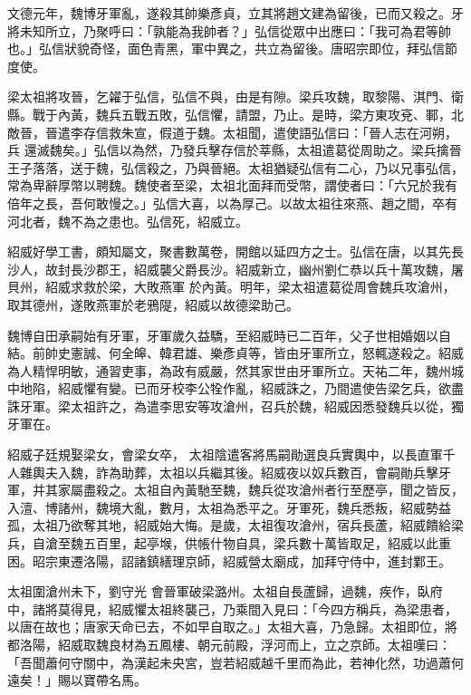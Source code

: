 \begin{pinyinscope}
 文德元年，魏博牙軍亂，遂殺其帥樂彥貞，立其將趙文建為留後，已而又殺之。牙將未知所立，乃聚呼曰：「孰能為我帥者？」弘信從眾中出應曰：「我可為君等帥也。」弘信狀貌奇怪，面色青黑，軍中異之，共立為留後。唐昭宗即位，拜弘信節度使。



 梁太祖將攻晉，乞糴于弘信，弘信不與，由是有隙。梁兵攻魏，取黎陽、淇門、衛縣。戰于內黃，魏兵五戰五敗，弘信懼，請盟，乃止。是時，梁方東攻兗、鄆，北敵晉，晉遣李存信救朱宣，假道于魏。太祖聞，遣使語弘信曰：「晉人志在河朔，兵
 還滅魏矣。」弘信以為然，乃發兵擊存信於莘縣，太祖遣葛從周助之。梁兵擒晉王子落落，送于魏，弘信殺之，乃與晉絕。太祖猶疑弘信有二心，乃以兄事弘信，常為卑辭厚幣以聘魏。魏使者至梁，太祖北面拜而受幣，謂使者曰：「六兄於我有倍年之長，吾何敢慢之。」弘信大喜，以為厚己。以故太祖往來燕、趙之間，卒有河北者，魏不為之患也。弘信死，紹威立。



 紹威好學工書，頗知屬文，聚書數萬卷，開館以延四方之士。弘信在唐，以其先長沙人，故封長沙郡王，紹威襲父爵長沙。紹威新立，幽州劉仁恭以兵十萬攻魏，屠貝州，紹威求救於梁，大敗燕軍
 於內黃。明年，梁太祖遣葛從周會魏兵攻滄州，取其德州，遂敗燕軍於老鴉隄，紹威以故德梁助己。



 魏博自田承嗣始有牙軍，牙軍歲久益驕，至紹威時已二百年，父子世相婚姻以自結。前帥史憲誠、何全皞、韓君雄、樂彥貞等，皆由牙軍所立，怒輒遂殺之。紹威為人精悍明敏，通習吏事，為政有威嚴，然其家世由牙軍所立。天祐二年，魏州城中地陷，紹威懼有變。已而牙校李公牷作亂，紹威誅之，乃間遣使告梁乞兵，欲盡誅牙軍。梁太祖許之，為遣李思安等攻滄州，召兵於魏，紹威因悉發魏兵以從，獨牙軍在。



 紹威子廷規娶梁女，會梁女卒，
 太祖陰遣客將馬嗣勛選良兵實輿中，以長直軍千人雜輿夫入魏，詐為助葬，太祖以兵繼其後。紹威夜以奴兵數百，會嗣勛兵擊牙軍，并其家屬盡殺之。太祖自內黃馳至魏，魏兵從攻滄州者行至歷亭，聞之皆反，入澶、博諸州，魏境大亂，數月，太祖為悉平之。牙軍死，魏兵悉叛，紹威勢益孤，太祖乃欲奪其地，紹威始大悔。是歲，太祖復攻滄州，宿兵長蘆，紹威饋給梁兵，自滄至魏五百里，起亭堠，供帳什物自具，梁兵數十萬皆取足，紹威以此重困。昭宗東遷洛陽，詔諸鎮繕理京師，紹威營太廟成，加拜守侍中，進封鄴王。



 太祖圍滄州未下，劉守光
 會晉軍破梁潞州。太祖自長蘆歸，過魏，疾作，臥府中，諸將莫得見，紹威懼太祖終襲己，乃乘間入見曰：「今四方稱兵，為梁患者，以唐在故也；唐家天命已去，不如早自取之。」太祖大喜，乃急歸。太祖即位，將都洛陽，紹威取魏良材為五鳳樓、朝元前殿，浮河而上，立之京師。太祖嘆曰：「吾聞蕭何守關中，為漢起未央宮，豈若紹威越千里而為此，若神化然，功過蕭何遠矣！」賜以寶帶名馬。




\end{pinyinscope}
